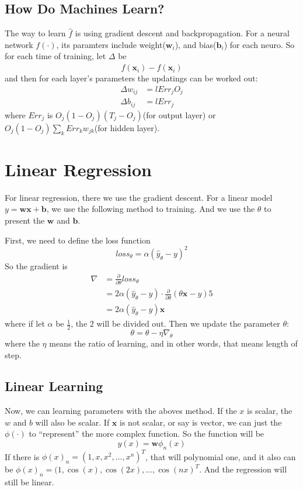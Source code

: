 \documentclass{article}
\begin{document}
\subsection{How Do Machines Learn?}
\label{sec:nn:how}

The way to learn $\hat{f}$ is using gradient descent and backpropagation.
For a neural network $f(\cdot)$, its paramters include weight($\mathbf{w}_i$),
and bias($\mathbf{b}_i$) for each neuro. So for each time of training, 
let $\Delta$ be
$$
 f(\mathbf{x}_i) - \hat{f}(\mathbf{x}_i)
$$
and then for each layer's parameters the updatings can be worked out:
\begin{align*}
  \Delta w_{ij} &= l{Err_jO_j} \\
  \Delta b_{ij} &= l{Err_j}
\end{align*}
where $Err_j$ is $O_j(1-O_j)(T_j-O_j)$(for output layer) or $O_j(1-O_j)\sum\limits_kErr_kw_{jk}$(for hidden layer).


\section{Linear Regression}
\label{sec:lreg}

For linear regression, there we use the gradient descent.
For a linear model $y=\mathbf{w}\mathbf{x}+\mathbf{b}$, we use the following method to training.
And we use the $\theta$ to present the $\mathbf{w}$ and $\mathbf{b}$.

First, we need  to define the loss function
\[
loss_\theta = \alpha(\hat{y}_\theta - y)^2
\]
So the gradient is
\begin{align*}
\nabla &= \frac{\partial}{\partial \theta}loss_\theta \\
       &= 2\alpha (\hat{y}_\theta -y)\cdot \frac{\partial}{\partial \theta}\left(\theta \mathbf{x} - y\right) 5 \\
       &= 2\alpha(\hat{y}_\theta -y)\mathbf{x}
\end{align*}
where if let $\alpha$ be $\frac{1}{2}$, the $2$ will be divided out.
Then we update the parameter $\theta$:
\[
\theta = \theta - \eta\nabla_\theta
\]
where the $\eta$ means the ratio of learning, and in other words, that means length of step.

\subsection{Linear Learning}
\label{sec:lreg:how}

Now, we can learning parameters with the aboves method.
If the $x$ is scalar, the $w$ and $b$ will also be scalar. If $\mathbf{x}$ is not scalar, or say is vector,
we can just the $\phi(\cdot)$ to ``represent'' the more complex function.
So the function will be 
\[
y(x) = \mathbf{w}\phi_n(x)
\]
If there is $\phi(x)_n = (1,x,x^2,\dots,x^n)^T$, that will polynomial one, and it also can be $\phi(x)_n = (1,\cos(x),\cos(2x),\dots,\cos(nx)^T$.
And the regression will still be linear.
\end{document}

